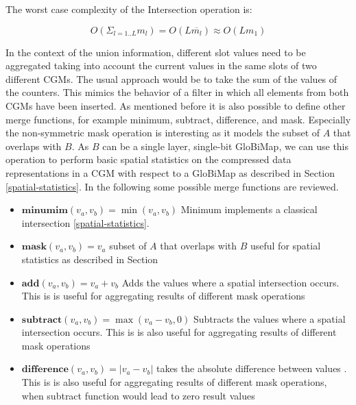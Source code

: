 \documentclass[sigconf, nonacm]{acmart}
\begin{document}
The worst case complexity of the Intersection operation is:

$$O(\Sigma_{l = 1..L}{m_l}) = O(L \overline{m_l}) \approx O(L m_1)$$


In the context of the union information, different slot values need to be aggregated taking into account the current values in the same slots of two different CGMs. The usual approach would be to take the sum of the values of the counters. This mimics the behavior of a filter in which all elements from both CGMs have been inserted. As mentioned before it is also possible to define other merge functions, for example minimum, subtract, difference, and mask. Especially the non-symmetric mask operation is interesting as it models the subset of $A$ that overlaps with $B$. As $B$ can be a single layer, single-bit GloBiMap, we can use this operation to perform basic spatial statistics on the compressed data representations in a CGM with respect to a GloBiMap as described in Section \ref{spatial-statistics}.
In the following some possible merge functions are reviewed.
\begin{itemize}
  \item{$\textbf{minumim}(v_a, v_b) = \min(v_a, v_b)$ Minimum implements a classical intersection \ref{spatial-statistics}.}
  \item{$\textbf{mask}(v_a, v_b) = v_a$ subset of $A$ that overlaps with $B$ useful for spatial statistics as described in Section }
  \item{$\textbf{add}(v_a, v_b) = v_a + v_b$ Adds the values where a spatial intersection occurs. This is is useful for aggregating results of different mask operations}
  \item{$\textbf{subtract}(v_a, v_b) = \max(v_a - v_b, 0)$ Subtracts the values where a spatial intersection occurs. This is is also useful for aggregating results of different mask operations}
  \item{$\textbf{difference}(v_a, v_b) = |v_a - v_b|$ takes the absolute difference between values . This is is also useful for aggregating results of different mask operations, when subtract function would lead to zero result values}
\end{itemize}


\end{document}
